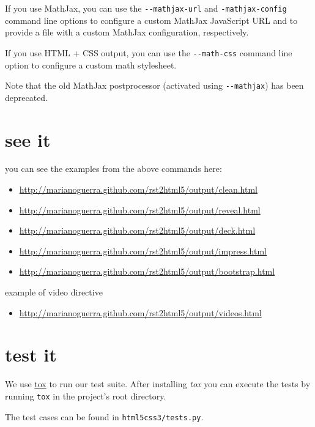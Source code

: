 \documentclass[a4paper]{article}
\begin{document}
If you use MathJax, you can use the \texttt{-{}-mathjax-url} and \texttt{-mathjax-config} command line options to configure a custom MathJax JavaScript URL and to provide a file with a custom MathJax configuration, respectively.

If you use HTML + CSS output, you can use the \texttt{-{}-math-css} command line option to configure a custom math stylesheet.

Note that the old MathJax postprocessor (activated using \texttt{-{}-mathjax}) has been deprecated.


\section{see it%
  \label{see-it}%
}

you can see the examples from the above commands here:

\begin{itemize}
\item \url{http://marianoguerra.github.com/rst2html5/output/clean.html}

\item \url{http://marianoguerra.github.com/rst2html5/output/reveal.html}

\item \url{http://marianoguerra.github.com/rst2html5/output/deck.html}

\item \url{http://marianoguerra.github.com/rst2html5/output/impress.html}

\item \url{http://marianoguerra.github.com/rst2html5/output/bootstrap.html}
\end{itemize}

example of video directive

\begin{itemize}
\item \url{http://marianoguerra.github.com/rst2html5/output/videos.html}
\end{itemize}


\section{test it%
  \label{test-it}%
}

We use \href{https://tox.readthedocs.org}{tox} to run our test suite. After installing \emph{tox} you can execute the tests by running \texttt{tox} in the project's root directory.

The test cases can be found in \texttt{html5css3/tests.py}.
\end{document}
